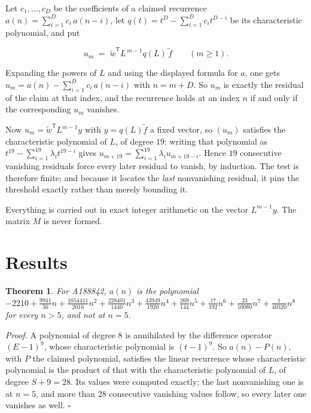 \documentclass[11pt]{article}
\newtheorem{theorem}{Theorem}
\theoremstyle{definition}
\begin{document}
Let $c_1,\dots,c_D$ be the coefficients of a claimed recurrence $a(n) = \sum_{i=1}^{D} c_i\,a(n-i)$, let $q(t) = t^{D} - \sum_{i=1}^{D} c_i t^{D-i}$ be its characteristic polynomial, and put

\[u_m \;=\; \tilde w^{\mathsf T} L^{\,m-1} q(L)\,\tilde f \qquad (m \ge 1).\]

Expanding the powers of $L$ and using the displayed formula for $a$, one gets $u_m = a(n) - \sum_{i=1}^{D} c_i\,a(n-i)$ with $n = m + D$. So $u_m$ is exactly the residual of the claim at that index, and the recurrence holds at an index $n$ if and only if the corresponding $u_m$ vanishes.

Now $u_m = \tilde w^{\mathsf T} L^{m-1} y$ with $y = q(L)\tilde f$ a fixed vector, so $(u_m)$ satisfies the characteristic polynomial of $L$, of degree $19$: writing that polynomial as $t^{19} - \sum_{i=1}^{19} \lambda_i t^{19-i}$ gives $u_{m+19} = \sum_{i=1}^{19} \lambda_i u_{m+19-i}$. Hence $19$ consecutive vanishing residuals force every later residual to vanish, by induction. The test is therefore finite; and because it locates the {\itshape last} nonvanishing residual, it pins the threshold exactly rather than merely bounding it.

Everything is carried out in exact integer arithmetic on the vector $L^{m-1}y$. The matrix $M$ is never formed.

\section{Results}

\begin{theorem} For A188842, $a(n)$ is the polynomial $-2210 + \frac{9941}{56}n + \frac{1054411}{2016}n^{2} + \frac{228401}{1440}n^{3} + \frac{43949}{1920}n^{4} + \frac{269}{144}n^{5} + \frac{17}{192}n^{6} + \frac{23}{10080}n^{7} + \frac{1}{40320}n^{8}$ for every $n > 5$, and not at $n = 5$.\end{theorem}

{\itshape Proof.} A polynomial of degree $8$ is annihilated by the difference operator $(E-1)^{9}$, whose characteristic polynomial is $(t-1)^{9}$. So $a(n) - P(n)$, with $P$ the claimed polynomial, satisfies the linear recurrence whose characteristic polynomial is the product of that with the characteristic polynomial of $L$, of degree $S + 9 = 28$. Its values were computed exactly; the last nonvanishing one is at $n = 5$, and more than $28$ consecutive vanishing values follow, so every later one vanishes as well. $\square$
\end{document}
